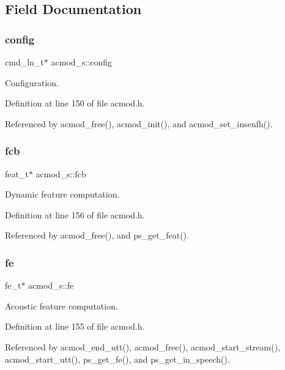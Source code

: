 \subsection{Field Documentation}
\mbox{\label{structacmod__s_a3563f4d0bdc48d3ee140b9e28806279d}} 
\subsubsection{config}
{\footnotesize\ttfamily cmd\+\_\+ln\+\_\+t$\ast$ acmod\+\_\+s\+::config}



Configuration. 



Definition at line 150 of file acmod.\+h.



Referenced by acmod\+\_\+free(), acmod\+\_\+init(), and acmod\+\_\+set\+\_\+insenfh().

\mbox{\label{structacmod__s_a37ec6c2b1f3ada764842e08481239b34}} 
\subsubsection{fcb}
{\footnotesize\ttfamily feat\+\_\+t$\ast$ acmod\+\_\+s\+::fcb}



Dynamic feature computation. 



Definition at line 156 of file acmod.\+h.



Referenced by acmod\+\_\+free(), and ps\+\_\+get\+\_\+feat().

\mbox{\label{structacmod__s_a56eaceb9b6a1cbcccd09cf42cfa87231}} 
\subsubsection{fe}
{\footnotesize\ttfamily fe\+\_\+t$\ast$ acmod\+\_\+s\+::fe}



Acoustic feature computation. 



Definition at line 155 of file acmod.\+h.



Referenced by acmod\+\_\+end\+\_\+utt(), acmod\+\_\+free(), acmod\+\_\+start\+\_\+stream(), acmod\+\_\+start\+\_\+utt(), ps\+\_\+get\+\_\+fe(), and ps\+\_\+get\+\_\+in\+\_\+speech().

